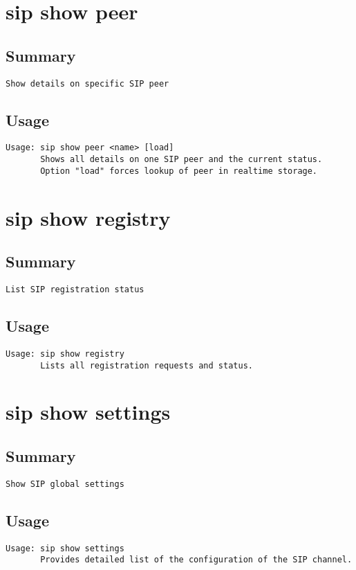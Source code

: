 \section{sip show peer}
\subsection{Summary}
\begin{verbatim}
Show details on specific SIP peer
\end{verbatim}
\subsection{Usage}
\begin{verbatim}
Usage: sip show peer <name> [load]
       Shows all details on one SIP peer and the current status.
       Option "load" forces lookup of peer in realtime storage.

\end{verbatim}


\section{sip show registry}
\subsection{Summary}
\begin{verbatim}
List SIP registration status
\end{verbatim}
\subsection{Usage}
\begin{verbatim}
Usage: sip show registry
       Lists all registration requests and status.

\end{verbatim}


\section{sip show settings}
\subsection{Summary}
\begin{verbatim}
Show SIP global settings
\end{verbatim}
\subsection{Usage}
\begin{verbatim}
Usage: sip show settings
       Provides detailed list of the configuration of the SIP channel.

\end{verbatim}


